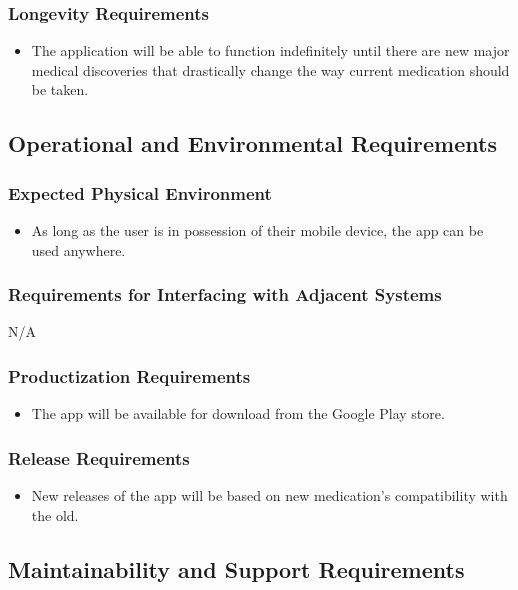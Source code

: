 \documentclass[12pt]{article}
\begin{document}
\subsubsection{Longevity Requirements}
\begin{itemize}
\item The application will be able to function indefinitely until there are new major medical discoveries that drastically change the way current medication should be taken.
\end{itemize}

\subsection{Operational and Environmental Requirements}

\subsubsection{Expected Physical Environment}
\begin{itemize}
\item As long as the user is in possession of their mobile device, the app can be used anywhere.
\end{itemize}

\subsubsection{Requirements for Interfacing with Adjacent Systems}
N/A

\subsubsection{Productization Requirements}
\begin{itemize}
\item The app will be available for download from the Google Play store.
\end{itemize}

\subsubsection{Release Requirements}
\begin{itemize}
\item New releases of the app will be based on new medication’s compatibility with the old.
\end{itemize}

\subsection{Maintainability and Support Requirements}
\end{document}
